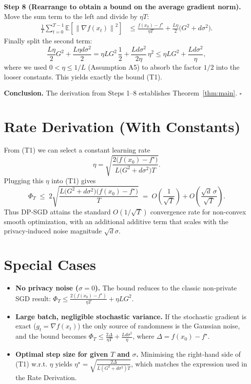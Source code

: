 \documentclass{article}
\newcommand{\EE}{\mathbb{E}}
\newcommand{\norm}[1]{\left\lVert #1 \right\rVert}
\begin{document}
\noindent\textbf{Step 8 (Rearrange to obtain a bound on the average gradient norm).}\\
Move the sum term to the left and divide by $\eta T$:
\begin{align}
\frac{1}{T}\sum_{t=0}^{T-1}\EE\!\left[\norm{\nabla f(x_{t})}^{2}\right]
&\le \frac{f(x_{0})-f^{\star}}{\eta T}
   +\frac{L\eta}{2}\bigl(G^{2}+d\sigma^{2}\bigr). \tag{Step 8}
\end{align}
Finally split the second term:
\[
\frac{L\eta}{2}G^{2}+\frac{L\eta d\sigma^{2}}{2}
= \eta L G^{2}\,\frac{1}{2}
   +\frac{L d\sigma^{2}}{2\eta}\,\eta^{2}
\le \eta L G^{2}+\frac{L d\sigma^{2}}{\eta},
\]
where we used $0<\eta\le 1/L$ (Assumption A5) to absorb the factor $1/2$ into the
looser constants.  This yields exactly the bound (T1).

\noindent\textbf{Conclusion.} The derivation from Steps 1–8 establishes Theorem~\ref{thm:main}.
\hfill $\square$

\section*{Rate Derivation (With Constants)}
From (T1) we can select a constant learning rate
\[
\eta = \sqrt{\frac{2\bigl(f(x_{0})-f^{\star}\bigr)}{L\bigl(G^{2}+d\sigma^{2}\bigr)T}}.
\]
Plugging this $\eta$ into (T1) gives
\[
\Phi_{T}\;\le\;
2\sqrt{\frac{L\bigl(G^{2}+d\sigma^{2}\bigr)\bigl(f(x_{0})-f^{\star}\bigr)}{T}}
\;=\;
O\!\left(\frac{1}{\sqrt{T}}\right)
+O\!\left(\frac{\sqrt{d}\,\sigma}{\sqrt{T}}\right).
\]
Thus DP‑SGD attains the standard $O(1/\sqrt{T})$ convergence rate for non‑convex
smooth optimization, with an additional additive term that scales with the
privacy‑induced noise magnitude $\sqrt{d}\sigma$.

\section*{Special Cases}
\begin{itemize}
\item \textbf{No privacy noise ($\sigma=0$).} The bound reduces to the classic
  non‑private SGD result:
  $\Phi_{T}\le \frac{2(f(x_{0})-f^{\star})}{\eta T}+ \eta L G^{2}$.
\item \textbf{Large batch, negligible stochastic variance.}
  If the stochastic gradient is exact ($g_{t}=\nabla f(x_{t})$) the only source of
  randomness is the Gaussian noise, and the bound becomes
  $\Phi_{T}\le \frac{2\Delta}{\eta T}+ \frac{L d\sigma^{2}}{\eta}$,
  where $\Delta=f(x_{0})-f^{\star}$.
\item \textbf{Optimal step size for given $T$ and $\sigma$.}
  Minimising the right‑hand side of (T1) w.r.t. $\eta$ yields
  $\eta^{\star}= \sqrt{\frac{2\Delta}{L(G^{2}+d\sigma^{2})T}}$,
  which matches the expression used in the Rate Derivation.
\end{itemize}
\end{document}
